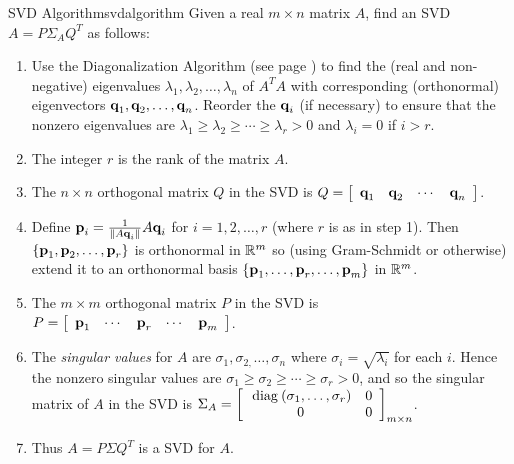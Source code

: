 \begin{theorem*}{SVD Algorithm}{svdalgorithm}
Given a real $m\times n$ matrix $A$, find an SVD $A=P\Sigma_{A}Q^{T}$ as follows:

\begin{enumerate}
\item Use the Diagonalization Algorithm (see page \pageref{thm:009304}) to find
the (real and non-negative) eigenvalues $\lambda_{1},\lambda_{2},\ldots,\lambda_{n}$ of $A^{T}A$ with corresponding (orthonormal) eigenvectors $\textbf{q}_{1},\textbf{q}_{2},\ldots ,\textbf{q}_{n}$. Reorder
the $\textbf{q}_{i}$ (if necessary) to ensure that the nonzero eigenvalues
are $\lambda_{1}\geq \lambda_{2}\geq \cdots \geq \lambda_{r}>0$ and $\lambda_{i}=0$ if $i>r$.

\item The integer $r$ is the rank of the matrix $A$.

\item The $n\times n$ orthogonal matrix $Q$ in the SVD is $Q=\left[ \begin{array}{cccc}\textbf{q}_{1} & \textbf{q}_{2} & \cdots & \textbf{q}_{n}\end{array}\right]$.

\item Define $\textbf{p}_{i}=\tfrac{1}{\| A\textbf{q}_{i}\|}A\textbf{q}_{i}$ for $i=1,2,\ldots ,r$ (where $r$ is as in step 1).
Then $\{\textbf{p}_{1},\textbf{p}_{2},\ldots ,\textbf{p}_{r}\}$ is
orthonormal in $\mathbb{R}^{m}$ so (using Gram-Schmidt or otherwise) extend
it to an orthonormal basis $\{\textbf{p}_{1},\ldots ,\textbf{p}_{r},\ldots , \textbf{p}_{m}\}$ in $\mathbb{R}^{m}$.

\item The $m\times m$ orthogonal matrix $P$ in the SVD is $P=\left[ \begin{array}{ccccc} \textbf{p}_{1} & \cdots & \textbf{p}_{r} & \cdots & \textbf{p}_{m}\end{array}\right]$.

\item The \emph{singular values} for $A$ are $\sigma_{1},\sigma_{2,}\ldots,\sigma_{n}$ where $\sigma_{i}=\sqrt{\lambda_{i}}$ for each $i$. Hence the nonzero singular values are $\sigma_{1}\geq \sigma_{2}\geq \cdots \geq \sigma_{r}>0$, and so the singular matrix of $A$ in the SVD is $\Sigma_{A}= 
\left[ 
\begin{array}{cc}
\thinspace\operatorname{diag\medspace}(\sigma_{1},\ldots ,\sigma_{r}) & 0 \\ 
0 & 0
\end{array}
\right]_{m\times n}$.

\item Thus $A=P\Sigma Q^{T}$ is a SVD for $A$.
\end{enumerate}
\end{theorem*}

